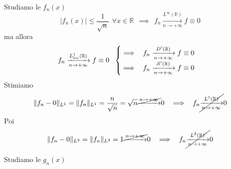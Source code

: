 Studiamo le $f_{n}( x)$
\begin{equation*}
| f_{n}( x)| \leqslant \frac{1}{\sqrt{n}} \ \ \forall x\in \mathbb{R} \ \ \implies \ \ f_{n}\xrightarrow[n\rightarrow +\infty ]{L^{\infty }(\mathbb{R})} f\equiv 0
\end{equation*}
ma allora
\begin{equation*}
f_{n}\xrightarrow[n\rightarrow +\infty ]{L^{1}_{\mathrm{loc}}(\mathbb{R})} f\equiv 0\ \ \begin{cases}
\implies \ \ f_{n}\xrightarrow[n\rightarrow +\infty ]{D'(\mathbb{R})} f\equiv 0\\
\implies \ \ f_{n}\xrightarrow[n\rightarrow +\infty ]{\mathcal{S}  '(\mathbb{R})} f\equiv 0
\end{cases}
\end{equation*}
Stimiamo
\begin{equation*}
\Vert f_{n} -0\Vert _{L^{1}} =\Vert f_{n}\Vert _{L^{1}} =\frac{n}{\sqrt{n}} =\sqrt{n}\cancel{\xrightarrow{n\rightarrow +\infty }} 0\ \ \implies \ \ f_{n}\cancel{\xrightarrow[n\rightarrow +\infty ]{L^{1}(\mathbb{R})}} 0
\end{equation*}
Poi
\begin{equation*}
\Vert f_{n} -0\Vert _{L^{2}} =\Vert f_{n}\Vert _{L^{2}} =1\cancel{\xrightarrow{n\rightarrow +\infty }} 0\ \ \implies \ \ f_{n}\cancel{\xrightarrow[n\rightarrow +\infty ]{L^{2}(\mathbb{R})}} 0
\end{equation*}


Studiamo le $g_{n}( x)$


